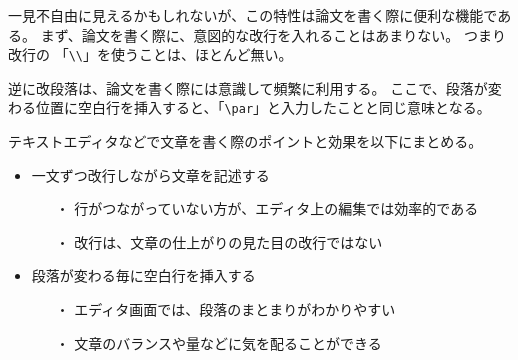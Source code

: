 \documentclass[a4paper,10pt,twocolumn]{jsarticle}
\begin{document}
一見不自由に見えるかもしれないが、この特性は論文を書く際に便利な機能である。
まず、論文を書く際に、意図的な改行を入れることはあまりない。
つまり改行の 「\verb+\\+」を使うことは、ほとんど無い。

逆に改段落は、論文を書く際には意識して頻繁に利用する。
ここで、段落が変わる位置に空白行を挿入すると、「\verb+\par+」と入力したことと同じ意味となる。

テキストエディタなどで文章を書く際のポイントと効果を以下にまとめる。
\begin{itemize}
\item 一文ずつ改行しながら文章を記述する
\begin{itemize}
\item[・] 行がつながっていない方が、エディタ上の編集では効率的である
\item[・] 改行は、文章の仕上がりの見た目の改行ではない
\end{itemize}
\item 段落が変わる毎に空白行を挿入する
\begin{itemize}
\item[・] エディタ画面では、段落のまとまりがわかりやすい
\item[・] 文章のバランスや量などに気を配ることができる
\end{itemize}
\end{itemize}
\end{document}
